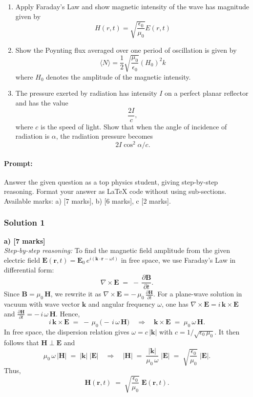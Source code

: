 \documentclass{article}
\begin{document}
\begin{enumerate}
    \item[(a)] Apply Faraday’s Law and show magnetic intensity of the wave has magnitude given by
    \[
    H(r, t) = \sqrt{\frac{\epsilon_0}{\mu_0}} E(r, t)
    \]

    \item[(b)] Show the Poynting flux averaged over one period of oscillation is given by
    \[
    \langle N \rangle = \frac{1}{2} \sqrt{\frac{\mu_0}{\epsilon_0}} (H_0)^2 \hat{k}
    \]
    where \(H_0\) denotes the amplitude of the magnetic intensity.

    \item[(c)] The pressure exerted by radiation has intensity \(I\) on a perfect planar reflector and has the value
    \[
    \frac{2I}{c},
    \]
    where \(c\) is the speed of light. Show that when the angle of incidence of radiation is \(\alpha\), the radiation pressure becomes
    \[
    2I \cos^2 \alpha / c.
    \]
\end{enumerate}

\paragraph{Prompt: \\} 
Answer the given question as a top physics student, giving step-by-step reasoning. Format your answer as LaTeX code without using sub-sections. Available marks: a) [7 marks], b) [6 marks], c [2 marks].

\subsubsection{Solution 1}
\textbf{a) [7 marks]}\\
\textit{Step-by-step reasoning:} 
To find the magnetic field amplitude from the given electric field 
\(\mathbf{E}(\mathbf{r},t) = \mathbf{E}_0\,e^{i(\mathbf{k}\cdot\mathbf{r}-\omega t)}\) in free space, 
we use Faraday's Law in differential form:
\[
\nabla\times \mathbf{E} \;=\; 
-\,\frac{\partial \mathbf{B}}{\partial t}.
\]
Since \(\mathbf{B} = \mu_0\,\mathbf{H}\), we rewrite it as 
\(\nabla \times \mathbf{E} = -\,\mu_0\,\frac{\partial \mathbf{H}}{\partial t}\). 
For a plane-wave solution in vacuum with wave vector \(\mathbf{k}\) and angular frequency \(\omega\), 
one has \(\nabla \times \mathbf{E} = i\,\mathbf{k}\times \mathbf{E}\) and 
\(\frac{\partial \mathbf{H}}{\partial t} = -\,i\,\omega\,\mathbf{H}\). 
Hence,
\[
i\,\mathbf{k}\times \mathbf{E} 
\;=\; -\,\mu_0\,\bigl(-\,i\,\omega\,\mathbf{H}\bigr) 
\quad\Longrightarrow\quad
\mathbf{k}\times \mathbf{E} 
\;=\; \mu_0\,\omega\,\mathbf{H}.
\]
In free space, the dispersion relation gives 
\(\omega = c\,|\mathbf{k}|\) with \(c=1/\sqrt{\epsilon_0\,\mu_0}\).  
It then follows that 
\(\mathbf{H}\perp\mathbf{E}\) and
\[
\mu_0\,\omega \,|\mathbf{H}| 
\;=\; |\mathbf{k}|\;|\mathbf{E}|
\quad\Longrightarrow\quad
|\mathbf{H}| 
\;=\; \frac{|\mathbf{k}|}{\mu_0\,\omega}\;|\mathbf{E}|
\;=\; \sqrt{\frac{\epsilon_0}{\mu_0}}\;|\mathbf{E}|.
\]
Thus,
\[
\mathbf{H}(\mathbf{r},t) 
\;=\; \sqrt{\frac{\epsilon_0}{\mu_0}}\;\mathbf{E}(\mathbf{r},t).
\]
\end{document}
